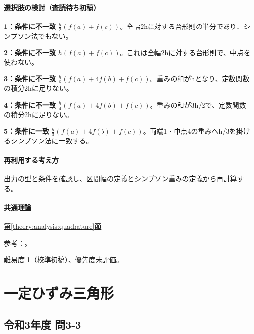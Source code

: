 \paragraph{選択肢の検討（査読待ち初稿）}\mbox{}\par

\noindent\textbf{1：条件に不一致} \(\frac h2(f(a)+f(c))\)。全幅2hに対する台形則の半分であり、シンプソン法でもない。\par

\noindent\textbf{2：条件に不一致} \(h(f(a)+f(c))\)。これは全幅2hに対する台形則で、中点を使わない。\par

\noindent\textbf{3：条件に不一致} \(\frac h6(f(a)+4f(b)+f(c))\)。重みの和がhとなり、定数関数の積分2hに足りない。\par

\noindent\textbf{4：条件に不一致} \(\frac h4(f(a)+4f(b)+f(c))\)。重みの和が3h/2で、定数関数の積分2hに足りない。\par

\noindent\textbf{5：条件に一致} \(\frac h3(f(a)+4f(b)+f(c))\)。両端1・中点4の重みへh/3を掛けるシンプソン法に一致する。\par

\paragraph{再利用する考え方} 出力の型と条件を確認し、区間幅の定義とシンプソン重みの定義から再計算する。

\paragraph{共通理論} \hyperref[theory:analysis:quadrature]{第\ref*{theory:analysis:quadrature}節}

\par 参考：\cite{nist_quadrature}。

\par 難易度 1（校準初稿）、優先度未評価。

\section{一定ひずみ三角形}

\subsection{令和3年度 問3-3}
\label{q:r03-reg-basic-3-3}

